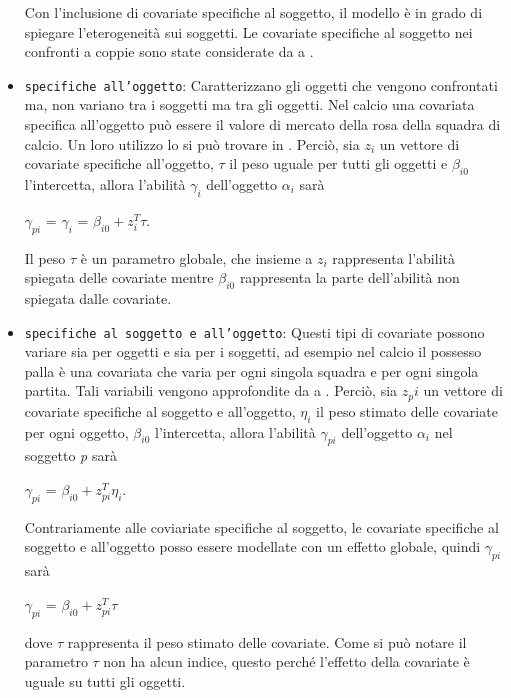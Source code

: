 \begin{itemize}
	Con l'inclusione di covariate specifiche al soggetto, il modello è in grado di spiegare l'eterogeneità sui soggetti. Le covariate specifiche al soggetto nei confronti a coppie sono state considerate da \autocite{francis2010} a \autocite{Turner2012Firth}.
	\item \texttt{specifiche all'oggetto}: Caratterizzano gli oggetti che vengono confrontati ma, non variano tra i soggetti ma tra gli oggetti. Nel calcio una covariata specifica all'oggetto può essere il valore di mercato della rosa della squadra di calcio. Un loro utilizzo lo si può trovare in \autocite{schauberger2017}.
	Perciò, sia $z_{i}$ un vettore di covariate specifiche all'oggetto, $\tau$ il peso uguale per tutti gli oggetti e $\beta_{i0}$ l'intercetta,  
	allora l'abilità $\gamma_{i}$ dell'oggetto $\alpha_{i}$ sarà
	\begin{center}
		$\gamma_{pi}$ = $ \gamma_{i}$ = $\beta_{i0} + z^{T}_{i}\tau$.
	\end{center}
	Il peso $\tau$ è un parametro globale, che insieme a $z_{i}$ rappresenta l'abilità spiegata delle covariate mentre $\beta_{i0}$ rappresenta la parte dell'abilità non spiegata dalle covariate. 
	\item \texttt{specifiche al soggetto e all'oggetto}: Questi tipi di covariate possono variare sia per oggetti e sia per i soggetti, ad esempio nel calcio il possesso palla è una covariata che varia per ogni singola squadra e per ogni singola partita. Tali variabili vengono approfondite da \autocite{thurner2000policy} a \autocite{mauerer2015modeling}. Perciò, sia 
	$z_pi$ un vettore di covariate specifiche al soggetto e all'oggetto, $\eta_i$ il peso stimato delle covariate per ogni oggetto, $\beta_{i0}$ l'intercetta, allora l'abilità $\gamma_{pi}$ dell'oggetto $\alpha_{i}$ nel soggetto \emph{p} sarà
		\begin{center}
		$ \gamma_{pi}$ = $\beta_{i0} + z^{T}_{pi}\eta_i$.
	\end{center}
	Contrariamente alle coviariate specifiche al soggetto, le covariate specifiche al soggetto e all'oggetto posso essere modellate con un effetto globale, quindi $\gamma_{pi}$ sarà
		\begin{center}
			$ \gamma_{pi}$ = $\beta_{i0} + z^{T}_{pi}\tau$
		\end{center}
	 dove $\tau$ rappresenta il peso stimato delle covariate. Come si può notare il parametro $\tau$ non ha alcun indice, questo perché l'effetto della covariate è uguale su tutti gli oggetti.
\end{itemize}






